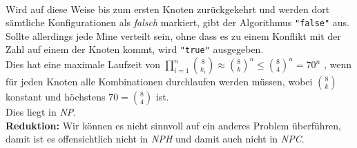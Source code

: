 \documentclass{article}
\begin{document}
\\
Wird auf diese Weise bis zum ersten Knoten zurückgekehrt und werden dort sämtliche Konfigurationen als \textit{falsch} markiert, gibt der Algorithmus \texttt{"false"} aus.
Sollte allerdings jede Mine verteilt sein, ohne dass es zu einem Konflikt mit der Zahl auf einem der Knoten kommt, wird \texttt{"true"} ausgegeben.\\
Dies hat eine maximale Laufzeit von $\prod_{i=1}^n \binom{8}{k_i} \approx \binom{8}{k}^n \leq \binom{8}{4}^n = 70^n$ , wenn für jeden Knoten alle Kombinationen durchlaufen werden müssen, wobei $\binom{8}{k}$ konstant und höchstens $70 = \binom{8}{4}$ ist.\\
Dies liegt in \textit{NP}.
\vspace{1cm}\-\\
\textbf{Reduktion:} Wir können es nicht sinnvoll auf ein anderes Problem überführen, damit ist es offensichtlich nicht in \textit{NPH} und damit auch nicht in \textit{NPC}.
\end{document}
